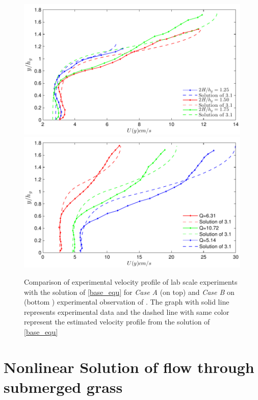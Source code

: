 \documentclass[12pt]{report}   %
\begin{document}
\begin{figure}
 {\includegraphics[]{Vivoni_Fig3_6_zero_shear_match}\\
 \includegraphics{Vivoni_Fig3_7_zero_shear_match}}
 \caption{Comparison of experimental velocity profile of lab scale experiments with the solution of \eqref{base_equ} for \textit{Case A } (on top) and \textit{Case B} on (bottom ) experimental observation of \cite{Vivoni98}. The graph with solid line represents experimental data and the dashed line with same color represent the estimated velocity profile from the solution of \eqref{base_equ}  }
 \label{VivoniFig}
\end{figure}


\chapter{Nonlinear Solution of flow through submerged grass}
\end{document}
